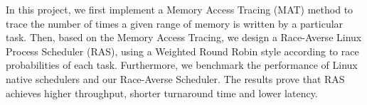 
\begin{abstract*}
  In this project, we first implement a Memory Access Tracing (MAT) method to trace the number of times a given range of memory is written by a particular task. Then, based on the Memory Access Tracing, we design a Race-Averse Linux Process Scheduler (RAS), using a Weighted Round Robin style according to race probabilities of each task. Furthermore, we benchmark the performance of Linux native schedulers and our Race-Averse Scheduler. The results prove that RAS achieves higher throughput, shorter turnaround time and lower latency.
\end{abstract*}
